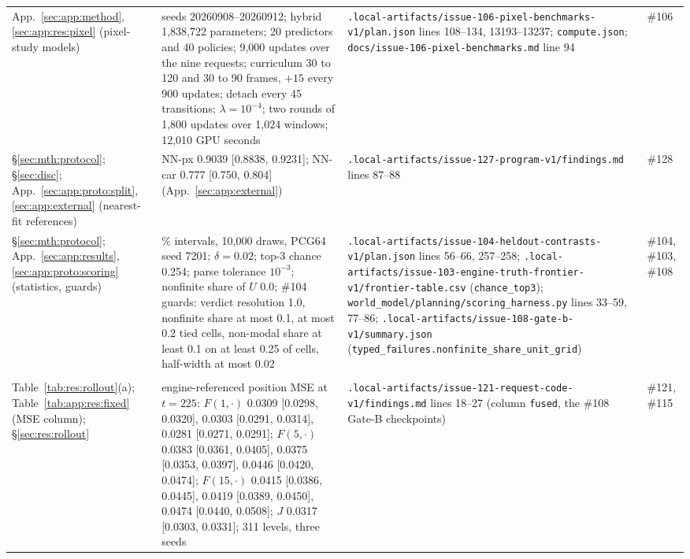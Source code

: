 {\begin{revblock}
\begin{longtable}{@{}>{\raggedright\arraybackslash}p{}>{\raggedright\arraybackslash}p{}>{\raggedright\arraybackslash}p{}>{\raggedright\arraybackslash}p{}@{}}
App.~\ref{sec:app:method}, \ref{sec:app:res:pixel} (pixel-study models) & seeds 20260908--20260912; hybrid 1,838,722 parameters; 20 predictors and 40 policies; 9,000 updates over the nine requests; curriculum 30 to 120 and 30 to 90 frames, $+15$ every 900 updates; detach every 45 transitions; $\lambda=10^{-4}$; two rounds of 1,800 updates over 1,024 windows; 12,010 GPU seconds & \nolinkurl{.local-artifacts/issue-106-pixel-benchmarks-v1/plan.json} lines 108--134, 13193--13237; \nolinkurl{compute.json}; \nolinkurl{docs/issue-106-pixel-benchmarks.md} line 94 & \#106 \\
\S\ref{sec:mth:protocol}; \S\ref{sec:disc}; App.~\ref{sec:app:proto:split}, \ref{sec:app:external} (nearest-fit references) & NN-px 0.9039 [0.8838, 0.9231]; NN-car 0.777 [0.750, 0.804] (App.~\ref{sec:app:external}) & \nolinkurl{.local-artifacts/issue-127-program-v1/findings.md} lines 87--88 & \#128 \\
\S\ref{sec:mth:protocol}; App.~\ref{sec:app:results}, \ref{sec:app:proto:scoring} (statistics, guards) & 95\% intervals, 10,000 draws, PCG64 seed 7201; $\delta=0.02$; top-3 chance 0.254; parse tolerance $10^{-3}$; nonfinite share of $U$ 0.0; \#104 guards: verdict resolution 1.0, nonfinite share at most 0.1, at most 0.2 tied cells, non-modal share at least 0.1 on at least 0.25 of cells, half-width at most 0.02 & \nolinkurl{.local-artifacts/issue-104-heldout-contrasts-v1/plan.json} lines 56--66, 257--258; \nolinkurl{.local-artifacts/issue-103-engine-truth-frontier-v1/frontier-table.csv} (\nolinkurl{chance_top3}); \nolinkurl{world_model/planning/scoring_harness.py} lines 33--59, 77--86; \nolinkurl{.local-artifacts/issue-108-gate-b-v1/summary.json} (\nolinkurl{typed_failures.nonfinite_share_unit_grid}) & \#104, \#103, \#108 \\
\multicolumn{4}{@{}l}{\emph{Results (Sections~\ref{sec:res} and~\ref{sec:disc}; Appendices~\ref{sec:app:results} and~\ref{sec:app:external})}} \\
Table~\ref{tab:res:rollout}(a); Table~\ref{tab:app:res:fixed} (MSE column); \S\ref{sec:res:rollout} & engine-referenced position MSE at $t=225$: $F(1,\cdot)$ 0.0309 [0.0298, 0.0320], 0.0303 [0.0291, 0.0314], 0.0281 [0.0271, 0.0291]; $F(5,\cdot)$ 0.0383 [0.0361, 0.0405], 0.0375 [0.0353, 0.0397], 0.0446 [0.0420, 0.0474]; $F(15,\cdot)$ 0.0415 [0.0386, 0.0445], 0.0419 [0.0389, 0.0450], 0.0474 [0.0440, 0.0508]; $J$ 0.0317 [0.0303, 0.0331]; 311 levels, three seeds & \nolinkurl{.local-artifacts/issue-121-request-code-v1/findings.md} lines 18--27 (column \texttt{fused}, the \#108 Gate-B checkpoints) & \#121, \#115 \\

\end{longtable}
\end{revblock}}
